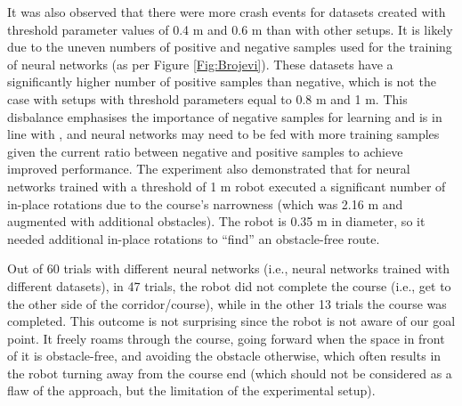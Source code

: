 It was also observed that there were more crash events for datasets created with threshold parameter values of 0.4 m and 0.6 m than with other setups. It is likely due to the uneven numbers of positive and negative samples used for the training of neural networks (as per Figure \ref{Fig:Brojevi}). These datasets have a significantly higher number of positive samples than negative, which is not the case with setups with threshold parameters equal to 0.8 m and 1 m. This disbalance emphasises the importance of negative samples for learning and is in line with \cite{Gandhi2017}, and neural networks may need to be fed with more training samples given the current ratio between negative and positive samples to achieve improved performance. The experiment also demonstrated that for neural networks trained with a threshold of  1 m robot executed a significant number of in-place rotations due to the course's narrowness (which was 2.16 m and augmented with additional obstacles). The robot is 0.35 m in diameter, so it needed additional in-place rotations to ``find'' an obstacle-free route.

Out of 60 trials with different neural networks (i.e., neural networks trained with different datasets), in 47 trials, the robot did not complete the course (i.e., get to the other side of the corridor/course), while in the other 13 trials the course was completed. This outcome is not surprising since the robot is not aware of our goal point. It freely roams through the course, going forward when the space in front of it is obstacle-free, and avoiding the obstacle otherwise, which often results in the robot turning away from the course end (which should not be considered as a flaw of the approach, but the limitation of the experimental setup).

